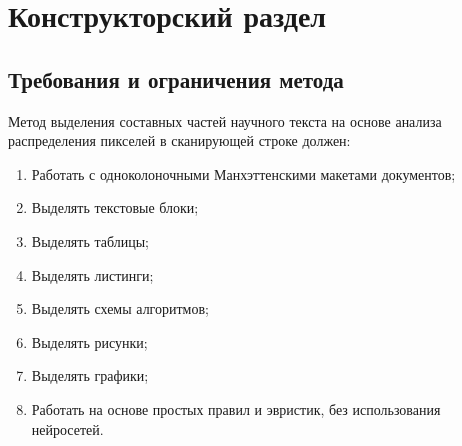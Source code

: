 \section{Конструкторский раздел}



\subsection{Требования и ограничения метода}

Метод выделения составных частей научного текста на основе анализа распределения пикселей в сканирующей строке должен:
\begin{enumerate}
    \item Работать с одноколоночными Манхэттенскими макетами документов;
    \item Выделять текстовые блоки;
    \item Выделять таблицы;
    \item Выделять листинги;
    \item Выделять схемы алгоритмов;
    \item Выделять рисунки;
    \item Выделять графики;
    \item Работать на основе простых правил и эвристик, без использования нейросетей.
\end{enumerate}

